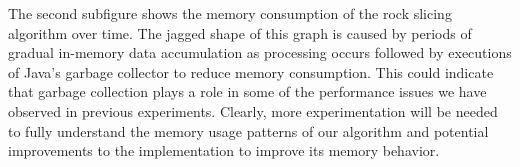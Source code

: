 The second subfigure shows the memory consumption of the rock slicing algorithm over time. The jagged shape of this graph is caused by periods of gradual in-memory data accumulation as processing occurs followed by executions of Java's garbage collector to reduce memory consumption. This could indicate that garbage collection plays a role in some of the performance issues we have observed in previous experiments. Clearly, more experimentation will be needed to fully understand the memory usage patterns of our algorithm and potential improvements to the implementation to improve its memory behavior.
